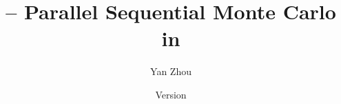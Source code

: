 \title{\protect\vsmc{} -- Parallel Sequential Monte Carlo in \protect\cpp}
\author{Yan Zhou}
\date{Version \version}
\maketitle
\tableofcontents
